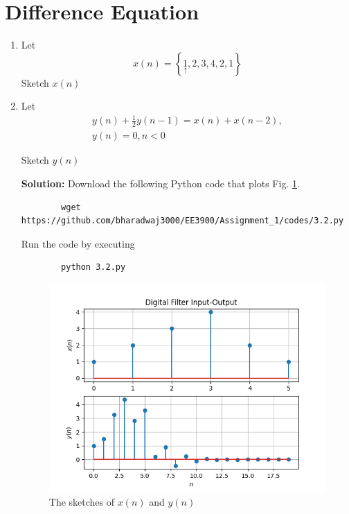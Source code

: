\documentclass[journal,12pt,twocolumn]{IEEEtran}
\newcommand{\solution}{\noindent \textbf{Solution: }}
\providecommand{\cbrak}[1]{\ensuremath{\left\{#1\right\}}}
\numberwithin{equation}{section}
\renewcommand\thesection{\arabic{section}}
\begin{document}
	\section{Difference Equation}
	\begin{enumerate}[label=\thesection.\arabic*,ref=\thesection.\theenumi]
	\item Let
	\begin{equation}
		\label{eq:filter_input}
		x(n) = \cbrak{\underset{\uparrow}{1},2,3,4,2,1}
	\end{equation}
	Sketch $x(n)$
	\item Let
	\begin{multline}
		\label{eq:iir_filter}
		y(n) + \frac{1}{2}y(n-1) = x(n) + x(n-2), \\
 		y(n) = 0, n < 0
	\end{multline}
	
	Sketch $y(n)$

	\solution Download the following Python code that plots Fig. \ref{fig-3.2}.
	\begin{lstlisting}
		wget https://github.com/bharadwaj3000/EE3900/Assignment_1/codes/3.2.py
	\end{lstlisting}
	
	Run the code by executing
	\begin{lstlisting}
		python 3.2.py
	\end{lstlisting}

	\begin{figure}[!ht]
		\centering
		\includegraphics[width=\columnwidth]{./figs/3.2.png}
		\caption{The sketches of $x(n)$ and $y(n)$}
		\label{fig-3.2}	
	\end{figure}
	

\end{enumerate}
\end{document}
